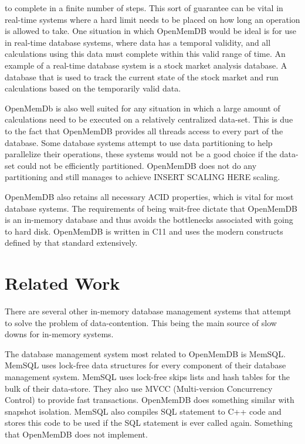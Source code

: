\documentclass[conference, compsoc]{IEEEtran}
\newcommand{\CC}{C\nolinebreak\hspace{-.05em}\raisebox{.4ex}{\tiny\bf +}\nolinebreak\hspace{-.10em}\raisebox{.4ex}{\tiny\bf +}}
\begin{document}
to complete in a finite number of steps. This sort of guarantee can be vital in 
real-time systems where a hard limit needs to be placed on how long an operation 
is allowed to take. One situation in which OpenMemDB would be ideal is for use in real-time 
database systems, where data has a temporal validity, and all calculations using this data 
must complete within this valid range of time. An example of a real-time database system 
is a stock market analysis database. A database that is used to track the current state
of the stock market and run calculations based on the temporarily valid data. 
\par\vspace{\baselineskip}
OpenMemDb
is also well suited for any situation in which a large amount of calculations need to be 
executed on a relatively centralized data-set. This is due to the fact that OpenMemDB 
provides all threads access to every part of the database. Some database systems attempt to 
use data partitioning to help parallelize their operations, these systems would not be a 
good choice if the data-set could not be efficiently partitioned. OpenMemDB does not do any 
partitioning and still manages to achieve {{INSERT SCALING HERE}} scaling. 
\par\vspace{\baselineskip}
OpenMemDB also 
retains all necessary ACID properties, which is vital for most database systems. 
The requirements of being wait-free dictate that 
OpenMemDB is an in-memory database and thus avoids the bottlenecks associated with 
going to hard disk. OpenMemDB is written in \CC 11 and uses the modern constructs defined by 
that standard extensively.
\par\vspace{\baselineskip}

\section{Related Work}
There are several other in-memory database management systems that attempt to solve the 
problem of data-contention. This being the main source of slow downs for in-memory systems.

The database management system most related to OpenMemDB is MemSQL.
MemSQL uses lock-free data structures for every component of their database management
system. MemSQL uses lock-free skips lists and hash tables for the bulk of their data-store\cite{MemSQL}.
They also use MVCC (Multi-version Concurrency Control) to provide fast transactions. 
OpenMemDB does something similar with snapshot isolation. MemSQL also compiles SQL
statement to C++ code and stores this code to be used if the SQL statement is ever called
again. Something that OpenMemDB does not implement.
\end{document}
